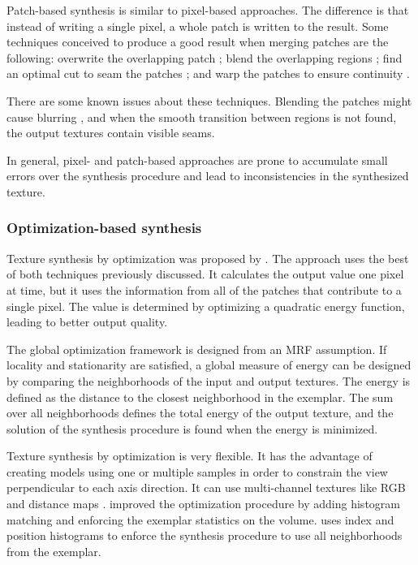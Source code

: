 Patch-based synthesis is similar to pixel-based approaches. 
The difference is that instead of writing a single pixel, a whole patch is written to the result. 
Some techniques conceived to produce a good result when merging patches are
the following:
overwrite the overlapping patch \cite{praun2000lapped};
blend the overlapping regions \cite{liang2001real};
find an optimal cut to seam the patches \cite{kwatra2003graphcut};
and warp the patches to ensure continuity \cite{wu2004feature}.

There are some known issues about these techniques. 
Blending the patches might cause blurring ,
and when the smooth transition between regions is not found,
the output textures contain visible seams.

In general, pixel- and patch-based approaches 
are prone to accumulate small errors 
over the synthesis procedure and lead to 
inconsistencies in the synthesized texture.

\subsubsection{Optimization-based synthesis}

Texture synthesis by optimization was proposed by \cite{kwatra:2005:SIGGRAPH}.
The approach uses the best of both techniques previously discussed. 
It calculates the output value one pixel at time, but it
uses the information from all of the patches that contribute 
to a single pixel. 
The value is determined by optimizing a 
quadratic energy function, leading to better output quality.

The global optimization framework is designed from 
an MRF assumption. If locality and stationarity are 
satisfied, a global measure of energy can 
be designed by comparing the neighborhoods 
of the input and output textures. 
The energy is defined as the distance to the
closest neighborhood in the exemplar.
The sum over all neighborhoods defines the total energy of the output texture,
and the solution of the synthesis procedure is found when 
the energy is minimized. 

Texture synthesis by optimization is very flexible. 
It has the advantage of creating models using one or multiple samples 
in order to constrain the view perpendicular to each axis direction.
It can use multi-channel textures like RGB and distance maps \cite{Lefebvre:2006:ATS:1141911.1141921}. 
\cite{KFCODLW07} improved the optimization procedure by adding 
histogram matching and enforcing the exemplar statistics on the volume.
\cite{chen2010high} uses index and position histograms to 
enforce the synthesis procedure to use all neighborhoods from the exemplar. 

